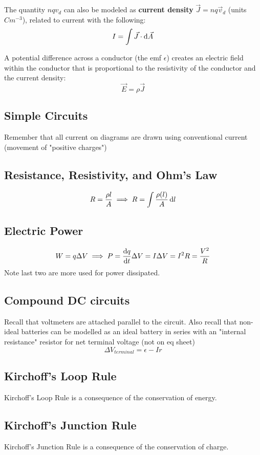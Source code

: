 \documentclass{article}
\begin{document}
The quantity $nqv_d$ can also be modeled as \textbf{current density} $\vec{J} = nq\vec{v}_d$ (units $\unit{C m^{-3}}$), related to current with the following:
\[I = \int \vec{J} \cdot \odif{\vec{A}}\]

A potential difference across a conductor (the emf $\epsilon$) creates an electric field within the conductor that is proportional to the resistivity of the conductor and the current density:
\[\vec{E} = \rho \vec{J}\]

\subsection{Simple Circuits}
Remember that all current on diagrams are drawn using conventional current (movement of "positive charges")

\subsection{Resistance, Resistivity, and Ohm's Law}
\[R = \frac{\rho l}{A} \implies R = \int \frac{\rho(l)}{A} \odif{l}\]

\subsection{Electric Power}
\[W = q \Delta V \implies P = \odv{q}{t} \Delta V = I \Delta V = I^2R = \frac{V^2}{R}\]
Note last two are more used for power dissipated.

\subsection{Compound DC circuits}
Recall that voltmeters are attached parallel to the circuit.
Also recall that non-ideal batteries can be modelled as an ideal battery in series with an "internal resistance" resistor for net terminal voltage (not on eq sheet)
\[\Delta V_{terminal} = \epsilon - Ir\]

\subsection{Kirchoff's Loop Rule}
Kirchoff's Loop Rule is a consequence of the conservation of energy.

\subsection{Kirchoff's Junction Rule}
Kirchoff's Junction Rule is a consequence of the conservation of charge.
\end{document}
